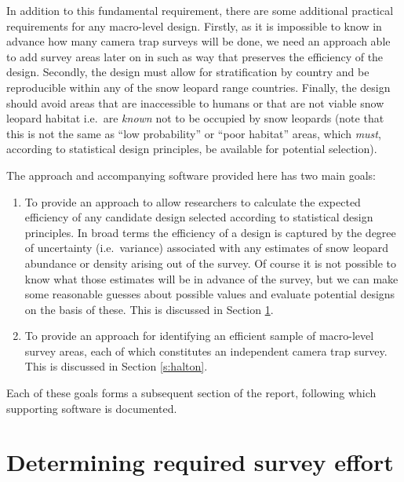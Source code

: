 \documentclass[a4paper,11pt, draft]{article} %
\begin{document}
In addition to this fundamental requirement, there are some additional practical requirements for any macro-level design. Firstly, as it is impossible to know in advance how many camera trap surveys will be done, we need an approach able to add survey areas later on in such as way that preserves the efficiency of the design. Secondly, the design must allow for stratification by country and be reproducible within any of the snow leopard range countries. Finally, the design should avoid areas that are inaccessible to humans or that are not viable snow leopard habitat i.e.\ are {\it known} not to be occupied by snow leopards (note that this is not the same as ``low probability'' or ``poor habitat'' areas, which {\it must}, according to statistical design principles, be available for potential selection).

The approach and accompanying software provided here has two main goals:
\begin{enumerate}
\item To provide an approach to allow researchers to calculate the expected efficiency of any candidate design selected according to statistical design principles. In broad terms the efficiency of a design is captured by the degree of uncertainty (i.e.\ variance) associated with any estimates of snow leopard abundance or density arising out of the survey. Of course it is not possible to know what those estimates will be in advance of the survey, but we can make some reasonable guesses about possible values and evaluate potential designs on the basis of these. This is discussed in Section \ref{s:effort}.
\item To provide an approach for identifying an efficient sample of macro-level survey areas, each of which constitutes an independent camera trap survey. This is discussed in Section \ref{s:halton}.
\end{enumerate}

Each of these goals forms a subsequent section of the report, following which supporting software is documented.

\section{Determining required survey effort} \label{s:effort}
\end{document}
